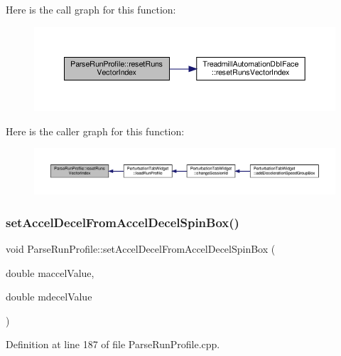 Here is the call graph for this function\+:
\nopagebreak
\begin{figure}[H]
\begin{center}
\leavevmode
\includegraphics[width=350pt]{class_parse_run_profile_aa5c2150a210598d9f14a04ff847ee0f3_cgraph}
\end{center}
\end{figure}
Here is the caller graph for this function\+:
\nopagebreak
\begin{figure}[H]
\begin{center}
\leavevmode
\includegraphics[width=350pt]{class_parse_run_profile_aa5c2150a210598d9f14a04ff847ee0f3_icgraph}
\end{center}
\end{figure}
\mbox{\label{class_parse_run_profile_aabc8065fa18e650ba1ed9eebd4c87938}} 
\subsubsection{\texorpdfstring{set\+Accel\+Decel\+From\+Accel\+Decel\+Spin\+Box()}{setAccelDecelFromAccelDecelSpinBox()}}
{\footnotesize\ttfamily void Parse\+Run\+Profile\+::set\+Accel\+Decel\+From\+Accel\+Decel\+Spin\+Box (\begin{DoxyParamCaption}\item[{double}]{maccel\+Value,  }\item[{double}]{mdecel\+Value }\end{DoxyParamCaption})}



Definition at line 187 of file Parse\+Run\+Profile.\+cpp.

